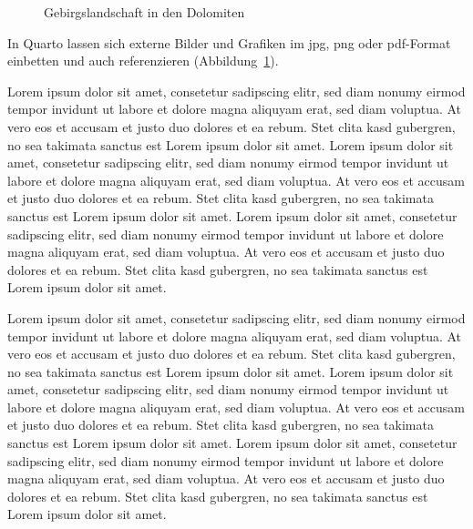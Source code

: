 \documentclass[
  11pt,
  a4paper,
]{tudscrreprt}
\begin{document}
\begin{figure}


\caption{\label{fig-mountains}Gebirgslandschaft in den Dolomiten}

\end{figure}%

In Quarto lassen sich externe Bilder und Grafiken im jpg, png oder
pdf-Format einbetten und auch referenzieren
(Abbildung~\ref{fig-mountains}).

Lorem ipsum dolor sit amet, consetetur sadipscing elitr, sed diam nonumy
eirmod tempor invidunt ut labore et dolore magna aliquyam erat, sed diam
voluptua. At vero eos et accusam et justo duo dolores et ea rebum. Stet
clita kasd gubergren, no sea takimata sanctus est Lorem ipsum dolor sit
amet. Lorem ipsum dolor sit amet, consetetur sadipscing elitr, sed diam
nonumy eirmod tempor invidunt ut labore et dolore magna aliquyam erat,
sed diam voluptua. At vero eos et accusam et justo duo dolores et ea
rebum. Stet clita kasd gubergren, no sea takimata sanctus est Lorem
ipsum dolor sit amet. Lorem ipsum dolor sit amet, consetetur sadipscing
elitr, sed diam nonumy eirmod tempor invidunt ut labore et dolore magna
aliquyam erat, sed diam voluptua. At vero eos et accusam et justo duo
dolores et ea rebum. Stet clita kasd gubergren, no sea takimata sanctus
est Lorem ipsum dolor sit amet.

Lorem ipsum dolor sit amet, consetetur sadipscing elitr, sed diam nonumy
eirmod tempor invidunt ut labore et dolore magna aliquyam erat, sed diam
voluptua. At vero eos et accusam et justo duo dolores et ea rebum. Stet
clita kasd gubergren, no sea takimata sanctus est Lorem ipsum dolor sit
amet. Lorem ipsum dolor sit amet, consetetur sadipscing elitr, sed diam
nonumy eirmod tempor invidunt ut labore et dolore magna aliquyam erat,
sed diam voluptua. At vero eos et accusam et justo duo dolores et ea
rebum. Stet clita kasd gubergren, no sea takimata sanctus est Lorem
ipsum dolor sit amet. Lorem ipsum dolor sit amet, consetetur sadipscing
elitr, sed diam nonumy eirmod tempor invidunt ut labore et dolore magna
aliquyam erat, sed diam voluptua. At vero eos et accusam et justo duo
dolores et ea rebum. Stet clita kasd gubergren, no sea takimata sanctus
est Lorem ipsum dolor sit amet.
\end{document}
